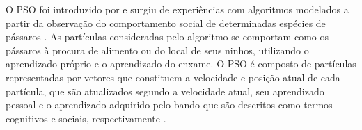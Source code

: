 \documentclass[journal]{IEEEtran}
\begin{document}
O PSO foi introduzido por \cite{Kennedy:1995} e surgiu de experiências com algoritmos modelados a partir da observação do comportamento social de determinadas espécies de pássaros \cite{Siciliano:2007}. As partículas consideradas pelo algoritmo se comportam como os pássaros à procura de alimento ou do local de seus ninhos, utilizando o aprendizado próprio e o aprendizado do enxame. O PSO é composto de partículas representadas por vetores que constituem a velocidade e posição atual de cada partícula, que são atualizados segundo a velocidade atual, seu aprendizado pessoal e o aprendizado adquirido pelo bando que são descritos como termos cognitivos e sociais, respectivamente \cite{Siciliano:2007}.\par%
  


%
%

\end{document}
